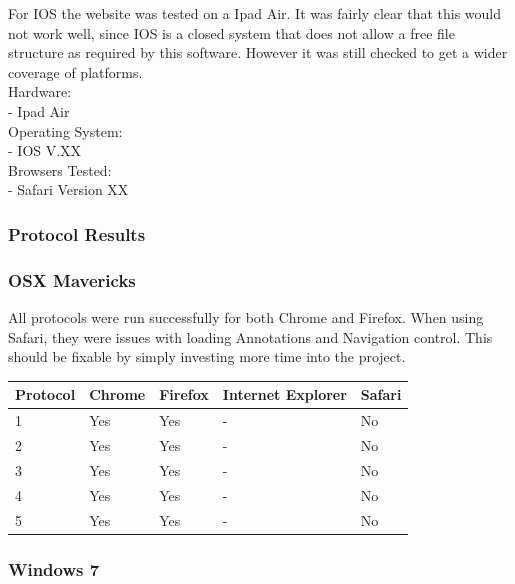 \documentclass[a4paper,11pt,twoside]{article}
\begin{document}
For IOS the website was tested on a Ipad Air. It was fairly clear that this would not work well, since IOS is a closed system that does not allow a free file structure as required by this software. However it was still checked to get a wider coverage of platforms.\\

\noindent Hardware:\\
- Ipad Air\\

\noindent Operating System:\\
- IOS V.XX\\

\noindent Browsers Tested:\\
- Safari Version XX



\subsubsection{Protocol Results}

\subsubsection*{OSX Mavericks}

All protocols were run successfully for both Chrome and Firefox. When using Safari, they were issues with loading Annotations and Navigation control. This should be fixable by simply investing more time into the project.\\


\begin{center}
  \begin{tabular}{ | l || l | l | l | l |}
    \hline
    Protocol & Chrome & Firefox & Internet Explorer & Safari \\ \hline \hline
    1 & Yes & Yes  & - & No   \\ \hline
    2 & Yes & Yes & - & No \\ \hline
    3 & Yes & Yes & - & No  \\ \hline
    4 & Yes & Yes & - & No  \\ \hline
    5 & Yes & Yes & - & No  \\
    \hline
  \end{tabular}
\end{center}

\subsubsection*{Windows 7}
\end{document}
